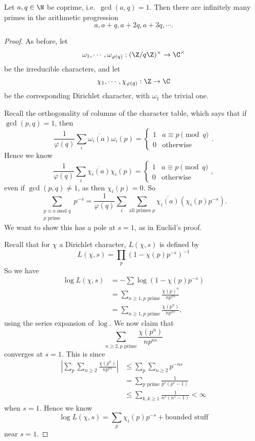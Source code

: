 \documentclass[a4paper]{article}
\begin{document}
\begin{thm}[Dirichlet, 1839]
  Let $a, q \in \N$ be coprime, i.e.\ $\gcd(a, q) = 1$. Then there are infinitely many primes in the arithmetic progression
  \[
    a, a + q, a + 2q, a + 3q, \cdots.
  \]
\end{thm}

\begin{proof}
  As before, let
  \[
    \omega_1, \cdots, \omega_{\varphi(q)}: (\Z/q\Z)^\times \to \C^\times
  \]
  be the irreducible characters, and let
  \[
    \chi_1, \cdots, \chi_{\varphi(q)}: \Z \to \C
  \]
  be the corresponding Dirichlet character, with $\omega_1$ the trivial one.

  Recall the orthogonality of columns of the character table, which says that if $\gcd(p, q) = 1$, then
  \[
    \frac{1}{\varphi(q)} \sum_i \overline{\omega_i(a)} \omega_i(p) =
    \begin{cases}
      1 & a \equiv p \pmod q\\
      0 & \text{otherwise}
    \end{cases}.
  \]
  Hence we know
  \[
    \frac{1}{\varphi(q)} \sum_i \overline{\chi_i(a)} \chi_i(p) =
    \begin{cases}
      1 & a \equiv p \pmod q\\
      0 & \text{otherwise}
    \end{cases},
  \]
  even if $\gcd(p, q) \not= 1$, as then $\chi_i(p) = 0$. So
  \[
    \sum_{\substack{p \equiv a \text{ mod } q\\ p \text{ prime}}} p^{-s} = \frac{1}{\varphi(q)} \sum_i \sum_{\text{all primes } p} \overline{\chi_i(a)} (\chi_i(p) p^{-s}).\tag{$\ddagger$}
  \]
  We want to show this has a pole at $s = 1$, as in Euclid's proof.

  Recall that for $\chi$ a Dirichlet character, $L(\chi, s)$ is defined by
  \[
    L(\chi, s) = \prod_p (1 - \chi(p) p^{-s})^{-1}
  \]
  So we have
  \begin{align*}
    \log L(\chi, s) &= -\sum \log (1 - \chi(p) p^{-s})\\
    &= \sum_{n \geq 1, p\text{ prime}} \frac{\chi(p)^n}{n p^{ns}}\\
    &= \sum_{n \geq 1, p\text{ prime}} \frac{\chi(p^n)}{np^{ns}},
  \end{align*}
  using the series expansion of $\log$. We now claim that
  \[
    \sum_{n \geq 2, p\text{ prime}} \frac{\chi(p^n)}{np^{ns}}
  \]
  converges at $s = 1$. This is since
  \begin{align*}
    \left|\sum_p\sum_{n\geq 2} \frac{\chi(p^n)}{np^{ns}}\right| &\leq \sum_p \sum_{n \geq 2} p^{-ns} \\
    &= \sum_{p\text{ prime}} \frac{1}{p^s(p^s - 1)}\\
    &\leq \sum_{k, k \geq 1} \frac{1}{n^s(n^s - 1)} < \infty
  \end{align*}
  when $s = 1$. Hence we know
  \[
    \log L(\chi, s) = \sum_p \chi_i(p) p^{-s} + \text{bounded stuff}
  \]
  near $s = 1$.


\end{proof}
\end{document}
